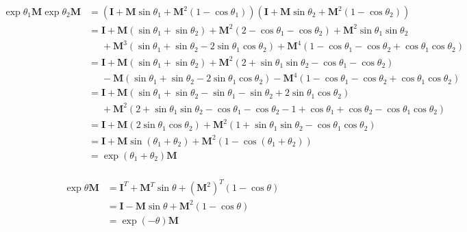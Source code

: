 \documentclass[10pt,oneside,a4paper]{article}
\begin{document}
\begin{enumerate}
\[
\begin{split}
\exp\theta_1\mathbf{M}\exp\theta_2\mathbf{M} &= \left(\mathbf{I} + \mathbf{M}\sin\theta_1 + \mathbf{M}^2(1 - \cos\theta_1)\right)\left(\mathbf{I} + \mathbf{M}\sin\theta_2 + \mathbf{M}^2(1 - \cos\theta_2)\right) \\
                                                         &= \mathbf{I} + \mathbf{M}(\sin\theta_1 + \sin\theta_2) + \mathbf{M}^2(2 - \cos\theta_1 - \cos\theta_2) + \mathbf{M}^2\sin\theta_1\sin\theta_2 \\
                                                         & \ \ \ \ \ \ + \mathbf{M}^3(\sin\theta_1 + \sin\theta_2 - 2\sin\theta_1\cos\theta_2) + \mathbf{M}^4(1 - \cos\theta_1 - \cos\theta_2 + \cos\theta_1\cos\theta_2)\\
                                                         &= \mathbf{I} + \mathbf{M}(\sin\theta_1 + \sin\theta_2) + \mathbf{M}^2(2 + \sin\theta_1\sin\theta_2 - \cos\theta_1 - \cos\theta_2) \\
                                                         & \ \ \ \ \ \ - \mathbf{M}(\sin\theta_1 + \sin\theta_2 - 2\sin\theta_1\cos\theta_2) - \mathbf{M}^4(1 - \cos\theta_1 - \cos\theta_2 + \cos\theta_1\cos\theta_2)\\
                                                         &= \mathbf{I} + \mathbf{M}(\sin\theta_1 + \sin\theta_2 - \sin\theta_1 - \sin\theta_2 + 2\sin\theta_1\cos\theta_2) \\
                                                         & \ \ \ \ \ \ + \mathbf{M}^2(2 + \sin\theta_1\sin\theta_2 - \cos\theta_1 - \cos\theta_2 - 1 + \cos\theta_1 + \cos\theta_2 - \cos\theta_1\cos\theta_2)\\
                                                         &= \mathbf{I} + \mathbf{M}(2\sin\theta_1\cos\theta_2) + \mathbf{M}^2(1 + \sin\theta_1\sin\theta_2 - \cos\theta_1\cos\theta_2) \\
                                                         &= \mathbf{I} + \mathbf{M}\sin(\theta_1 +\theta_2) + \mathbf{M}^2(1 - \cos(\theta_1 + \theta_2)) \\
                                                         &= \exp(\theta_1 + \theta_2)\mathbf{M} \\
\end{split}
\]

\[
\begin{split}
\exp\theta\mathbf{M} &= \mathbf{I}^T + \mathbf{M}^T\sin\theta + \left(\mathbf{M}^2\right)^T(1 - \cos\theta) \\
                           &= \mathbf{I} - \mathbf{M}\sin\theta + \mathbf{M}^2(1 - \cos\theta) \\
                           &= \exp(-\theta)\mathbf{M} \\
\end{split}
\]


\end{enumerate}
\end{document}
